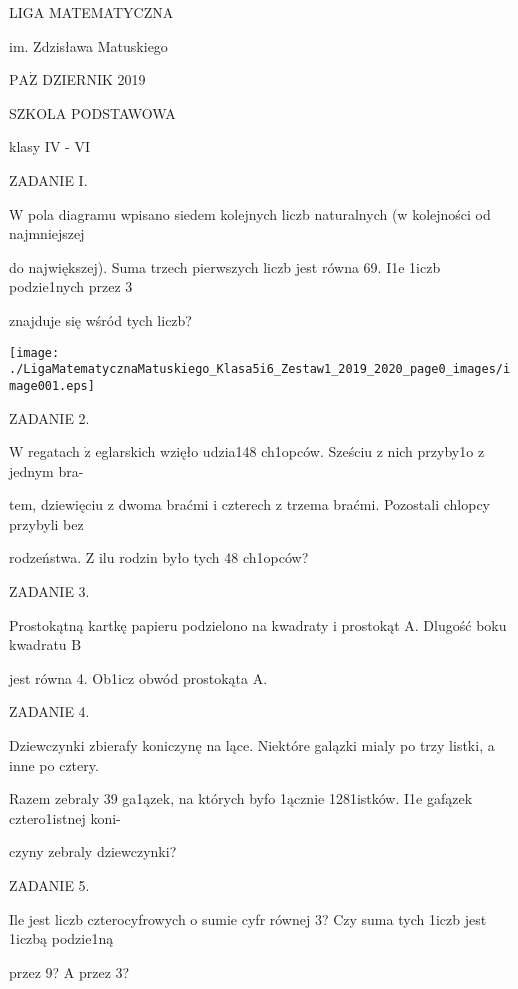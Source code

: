 \documentclass[a4paper,12pt]{article}
\begin{document}
LIGA MATEMATYCZNA

im. Zdzisława Matuskiego

$\mathrm{P}\mathrm{A}\dot{\mathrm{Z}}$ DZIERNIK 2019

SZKOLA PODSTAWOWA

klasy IV - VI

ZADANIE I.

W pola diagramu wpisano siedem kolejnych liczb naturalnych (w kolejności od najmniejszej

do największej). Suma trzech pierwszych liczb jest równa 69. I1e 1iczb podzie1nych przez 3

znajduje się wśród tych liczb?
\begin{center}
\texttt{[image: ./LigaMatematycznaMatuskiego\_Klasa5i6\_Zestaw1\_2019\_2020\_page0\_images/image001.eps]}
\end{center}
ZADANIE 2.

$\mathrm{W}$ regatach $\dot{\mathrm{z}}$ eglarskich wzięło udzia148 ch1opców. Sześciu z nich przyby1o z jednym bra-

tem, dziewięciu z dwoma braćmi i czterech z trzema braćmi. Pozostali chlopcy przybyli bez

rodzeństwa. $\mathrm{Z}$ ilu rodzin było tych 48 ch1opców?

ZADANIE 3.

Prostokątną kartkę papieru podzielono na kwadraty i prostokąt A. Dlugość boku kwadratu $\mathrm{B}$

jest równa 4. Ob1icz obwód prostokąta A.

ZADANIE 4.

Dziewczynki zbierafy koniczynę na lące. Niektóre galązki mialy po trzy listki, a inne po cztery.

Razem zebraly 39 ga1ązek, na których byfo 1ącznie 1281istków. I1e gafązek cztero1istnej koni-

czyny zebraly dziewczynki?

ZADANIE 5.

Ile jest liczb czterocyfrowych o sumie cyfr równej 3? Czy suma tych 1iczb jest 1iczbą podzie1ną

przez 9? A przez 3?
\end{document}
